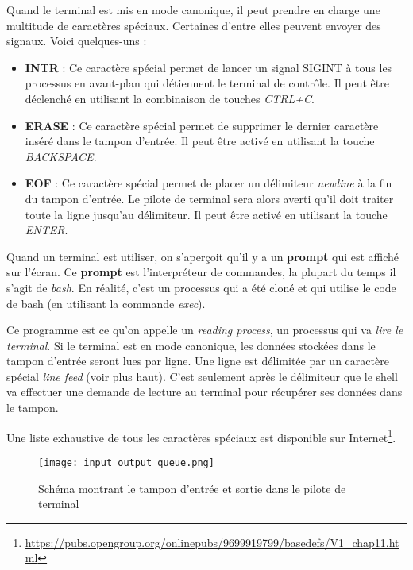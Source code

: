 Quand le terminal est mis en mode canonique, il peut prendre en charge une multitude de caractères spéciaux. Certaines d'entre elles peuvent envoyer des signaux. Voici quelques-uns :

\begin{itemize}
	\item \textbf{INTR} : Ce caractère spécial permet de lancer un signal SIGINT à tous les processus en avant-plan qui détiennent le terminal de contrôle. Il peut être déclenché en utilisant la combinaison de touches \textit{CTRL+C}.
	\item \textbf{ERASE} : Ce caractère spécial permet de supprimer le dernier caractère inséré dans le tampon d'entrée. Il peut être activé en utilisant la touche \textit{BACKSPACE}.
	\item \textbf{EOF} : Ce caractère spécial permet de placer un délimiteur \textit{newline} à la fin du tampon d'entrée. Le pilote de terminal sera alors averti qu'il doit traiter toute la ligne jusqu'au délimiteur. Il peut être activé en utilisant la touche \textit{ENTER}.
\end{itemize}

Quand un terminal est utiliser, on s'aperçoit qu'il y a un \textbf{prompt} qui est affiché sur l'écran. Ce \textbf{prompt} est l'interpréteur de commandes, la plupart du temps il s'agit de \textit{bash}. En réalité, c'est un processus qui a été cloné et qui utilise le code de bash (en utilisant la commande \textit{exec}).

Ce programme est ce qu'on appelle un \textit{reading process}, un processus qui va \textit{lire le terminal}. Si le terminal est en mode canonique, les données stockées dans le tampon d'entrée seront lues par ligne. Une ligne est délimitée par un caractère spécial \textit{line feed} (voir plus haut). C'est seulement après le délimiteur que le shell va effectuer une demande de lecture au terminal pour récupérer ses données dans le tampon.

Une liste exhaustive de tous les caractères spéciaux est disponible sur Internet\footnote{\url{https://pubs.opengroup.org/onlinepubs/9699919799/basedefs/V1_chap11.html}}.

\begin{figure}[h]
	\centering
	\texttt{[image: input\_output\_queue.png]}
	\caption{Schéma montrant le tampon d'entrée et sortie dans le pilote de terminal}
\end{figure}

